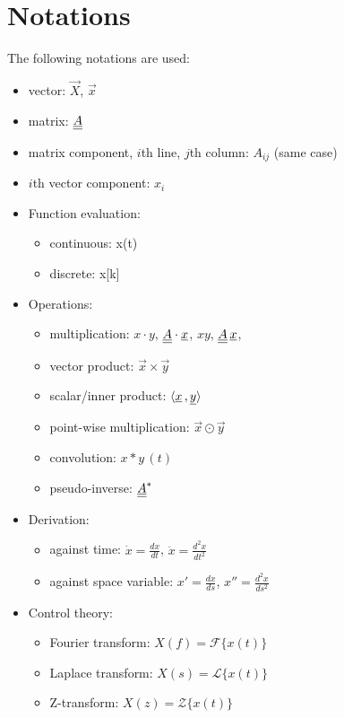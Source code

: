 
\chapter*{Notations}

The following notations are used:

\begin{itemize}
	\item vector: $\vec{X}$, $\vec{x}$
	\item matrix: $\underline{\underline{A}}$
	\item matrix component, $i$th line, $j$th column: $A_{ij}$ (same case)
	\item $i$th vector component: $x_i$
	\item Function evaluation:
	\begin{itemize}
		\item continuous: x(t)
		\item discrete: x[k]
	\end{itemize}
	\item Operations:
	\begin{itemize}
		\item multiplication: $x \cdot y$, $\underline{\underline{A}} \cdot \underline{x}$, $xy$, $\underline{\underline{A}} \, \underline{x}$, 
		\item vector product: $\vec{x} \times \vec{y}$
		\item scalar/inner product: $\langle \underline{x} {\,,\,} \underline{y} \rangle$
		\item point-wise multiplication: $\vec{x} \odot \vec{y}$
		\item convolution: $x * y\, (t)$
		\item pseudo-inverse: $\underline{\underline{A}}^*$
	\end{itemize}
	\item Derivation:
	\begin{itemize}
		\item against time: $\dot{x} = \frac{dx}{dt}$, $\ddot{x} = \frac{d^2 x}{dt^2}$
		\item against space variable: $x' = \frac{dx}{ds}$, $x'' = \frac{d^2 x}{ds^2}$
	\end{itemize}
	\item Control theory:
	\begin{itemize}
		\item Fourier transform: $X(f) = \mathcal{F}\{x(t)\}$
		\item Laplace transform: $X(s) = \mathcal{L}\{x(t)\}$
		\item Z-transform: $X(z) = \mathcal{Z}\{x(t)\}$
	\end{itemize}
\end{itemize}

